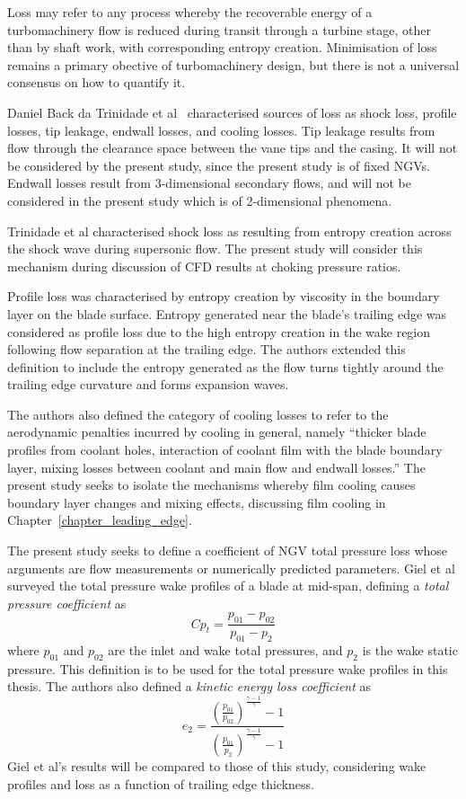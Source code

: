 \documentclass[a4paper, 11pt, twoside]{report}
\begin{document}
Loss may refer to any process whereby the recoverable energy of a turbomachinery flow is reduced during transit through a turbine stage, other than by shaft work, with corresponding entropy creation. Minimisation of loss remains a primary obective of turbomachinery design, but there is not a universal consensus on how to quantify it.

Daniel Back da Trinidade et al~\cite{trinidade_loss} characterised sources of loss as shock loss, profile losses, tip leakage, endwall losses, and cooling losses. Tip leakage results from flow through the clearance space between the vane tips and the casing. It will not be considered by the present study, since the present study is of fixed NGVs. Endwall losses result from 3-dimensional secondary flows, and will not be considered in the present study which is of 2-dimensional phenomena.

Trinidade et al characterised shock loss as resulting from entropy creation across the shock wave during supersonic flow. The present study will consider this mechanism during discussion of CFD results at choking pressure ratios.

Profile loss was characterised by entropy creation by viscosity in the boundary layer on the blade surface. Entropy generated near the blade's trailing edge was considered as profile loss due to the high entropy creation in the wake region following flow separation at the trailing edge. The authors extended this definition to include the entropy generated as the flow turns tightly around the trailing edge curvature and forms expansion waves.

The authors also defined the category of cooling losses to refer to the aerodynamic penalties incurred by cooling in general, namely ``thicker blade profiles from coolant holes, interaction of coolant film with the blade boundary layer, mixing losses between coolant and main flow and endwall losses.'' The present study seeks to isolate the mechanisms whereby film cooling causes boundary layer changes and mixing effects, discussing film cooling in Chapter~\ref{chapter_leading_edge}.

The present study seeks to define a coefficient of NGV total pressure loss whose arguments are flow measurements or numerically predicted parameters. Giel et al surveyed the total pressure wake profiles of a blade at mid-span, defining a \textit{total pressure coefficient} as
\begin{equation}
Cp_t = \frac{
p_{01} - p_{02}
}{
p_{01} - p_2
}
\end{equation}
where $p_{01}$ and $p_{02}$ are the inlet and wake total pressures, and $p_2$ is the wake static pressure. This definition is to be used for the total pressure wake profiles in this thesis. The authors also defined a \textit{kinetic energy loss coefficient} as
\begin{equation}
e_2 = \frac{ 
\left( \frac{p_{01}}{p_{02}} \right)^\frac{\gamma-1}{ \gamma } - 1 
}{
\left( \frac{p_{01}}{p_{2}} \right)^\frac{\gamma-1}{ \gamma } - 1 
}
\end{equation}
Giel et al's results will be compared to those of this study, considering wake profiles and loss as a function of trailing edge thickness.
\end{document}

